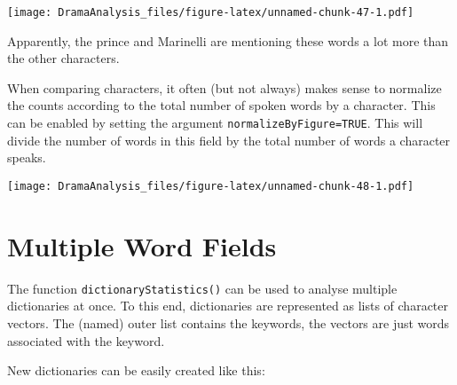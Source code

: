 \documentclass[]{book}
\newenvironment{Shaded}{\begin{snugshade}}{\end{snugshade}}
\newcommand{\CommentTok}[1]{\textcolor[rgb]{0.56,0.35,0.01}{\textit{#1}}}
\newcommand{\DataTypeTok}[1]{\textcolor[rgb]{0.13,0.29,0.53}{#1}}
\newcommand{\DecValTok}[1]{\textcolor[rgb]{0.00,0.00,0.81}{#1}}
\newcommand{\FloatTok}[1]{\textcolor[rgb]{0.00,0.00,0.81}{#1}}
\newcommand{\KeywordTok}[1]{\textcolor[rgb]{0.13,0.29,0.53}{\textbf{#1}}}
\newcommand{\NormalTok}[1]{#1}
\newcommand{\OperatorTok}[1]{\textcolor[rgb]{0.81,0.36,0.00}{\textbf{#1}}}
\newcommand{\OtherTok}[1]{\textcolor[rgb]{0.56,0.35,0.01}{#1}}
\newcommand{\StringTok}[1]{\textcolor[rgb]{0.31,0.60,0.02}{#1}}
\begin{document}
\texttt{[image: DramaAnalysis\_files/figure-latex/unnamed-chunk-47-1.pdf]}

Apparently, the prince and Marinelli are mentioning these words a lot more than the other characters.

When comparing characters, it often (but not always) makes sense to normalize the counts according to the total number of spoken words by a character. This can be enabled by setting the argument \texttt{normalizeByFigure=TRUE}. This will divide the number of words in this field by the total number of words a character speaks.

\begin{Shaded}
\end{Shaded}

\texttt{[image: DramaAnalysis\_files/figure-latex/unnamed-chunk-48-1.pdf]}

\hypertarget{multiple-word-fields}{%
\section{Multiple Word Fields}\label{multiple-word-fields}}

The function \texttt{dictionaryStatistics()} can be used to analyse multiple dictionaries at once. To this end, dictionaries are represented as lists of character vectors. The (named) outer list contains the keywords, the vectors are just words associated with the keyword.

New dictionaries can be easily created like this:
\end{document}
